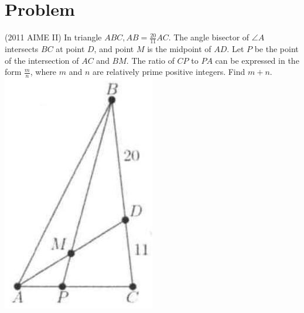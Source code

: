 \documentclass{article}
\begin{document}
\section*{Problem}
(2011 AIME II) In triangle \(A B C, A B=\frac{20}{11} A C\). The angle bisector of \(\angle A\) intersects \(B C\) at point \(D\), and point \(M\) is the midpoint of \(A D\). Let \(P\) be the point of the intersection of \(A C\) and \(B M\). The ratio of \(C P\) to \(P A\) can be expressed in the form \(\frac{m}{n}\), where \(m\) and \(n\) are relatively prime positive integers. Find \(m+n\).\\
\centering
\includegraphics[width=\textwidth]{images/065(3).jpg}
\end{document}
